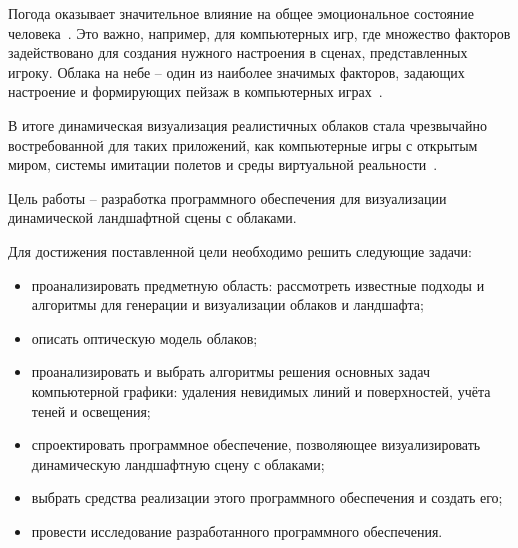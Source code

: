 
Погода оказывает значительное влияние на общее эмоциональное состояние человека~\cite{windahl_real_time_2018}.
Это важно, например, для компьютерных игр, где множество факторов задействовано для создания нужного настроения в сценах, представленных игроку. Облака на небе -- один из наиболее значимых факторов, задающих настроение и формирующих пейзаж в компьютерных играх~\cite{windahl_real_time_2018}.

В итоге динамическая визуализация реалистичных облаков стала чрезвычайно востребованной для таких приложений, как компьютерные игры с открытым миром, системы имитации полетов и среды виртуальной реальности~\cite{sym10040125, windahl_real_time_2018}.

Цель работы -- разработка программного обеспечения для визуализации динамической ландшафтной сцены с облаками.

Для достижения поставленной цели необходимо решить следующие задачи:
\begin{itemize}
	\item проанализировать предметную область: рассмотреть известные подходы и алгоритмы для генерации и визуализации облаков и ландшафта;
	\item описать оптическую модель облаков;
	\item проанализировать и выбрать алгоритмы решения основных задач компьютерной графики: удаления невидимых линий и поверхностей, учёта теней и освещения;
	\item спроектировать программное обеспечение, позволяющее визуализировать динамическую ландшафтную сцену с облаками;
	\item выбрать средства реализации этого программного обеспечения и создать его;
	\item провести исследование разработанного программного обеспечения.
\end{itemize}

